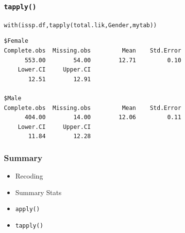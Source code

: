 \documentclass{beamer}\usepackage[]{graphicx}\usepackage[]{color}
\makeatletter
\newcommand{\hlstd}[1]{\textcolor[rgb]{0,0,0}{#1}}%
\newcommand{\hlkwd}[1]{\textcolor[rgb]{0,0.267,0.4}{#1}}%
\newenvironment{kframe}{%
 \def\at@end@of@kframe{}%
 \ifinner\ifhmode%
  \def\at@end@of@kframe{\end{minipage}}%
  \begin{minipage}{\columnwidth}%
 \fi\fi%
 \def\FrameCommand##1{\hskip\@totalleftmargin \hskip-\fboxsep
 \colorbox{shadecolor}{##1}\hskip-\fboxsep
     \hskip-\linewidth \hskip-\@totalleftmargin \hskip\columnwidth}%
 \MakeFramed {\advance\hsize-\width
   \@totalleftmargin\z@ \linewidth\hsize
   \@setminipage}}%
 {\par\unskip\endMakeFramed%
 \at@end@of@kframe}
\newenvironment{knitrout}{}{} %
\makeatother
\begin{document}
\begin{frame}[fragile]
\frametitle{\texttt{tapply()}}
\begin{knitrout}
\color{fgcolor}\begin{kframe}
\begin{alltt}
\hlkwd{with}\hlstd{(issp.df,} \hlkwd{tapply}\hlstd{(total.lik, Gender, mytab))}
\end{alltt}
\begin{verbatim}
$Female
Complete.obs  Missing.obs         Mean    Std.Error 
      553.00        54.00        12.71         0.10 
    Lower.CI     Upper.CI 
       12.51        12.91 

$Male
Complete.obs  Missing.obs         Mean    Std.Error 
      404.00        14.00        12.06         0.11 
    Lower.CI     Upper.CI 
       11.84        12.28 
\end{verbatim}
\end{kframe}
\end{knitrout}
\end{frame} 

\begin{frame}[fragile]
  \frametitle{Summary}
  \begin{itemize}
  \item Recoding
  \item Summary Stats
  \item \texttt{apply()}
  \item \texttt{tapply()}
  \end{itemize}
\end{frame}
\end{document}
